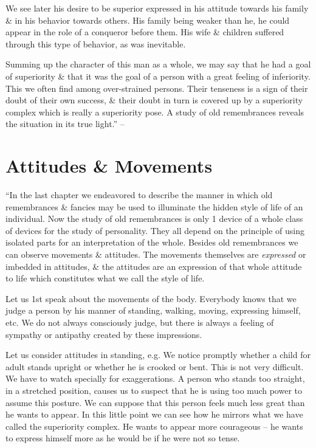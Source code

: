 \documentclass{article}
\begin{document}
We see later his desire to be superior expressed in his attitude towards his family \& in his behavior towards others. His family being weaker than he, he could appear in the role of a conqueror before them. His wife \& children suffered through this type of behavior, as was inevitable.

Summing up the character of this man as a whole, we may say that he had a goal of superiority \& that it was the goal of a person with a great feeling of inferiority. This we often find among over-strained persons. Their tenseness is a sign of their doubt of their own success, \& their doubt in turn is covered up by a superiority complex which is really a superiority pose. A study of old remembrances reveals the situation in its true light.'' -- \cite[pp. 117--134]{Adler_science_living}


\section{Attitudes \& Movements}
``In the last chapter we endeavored to describe the manner in which old remembrances \& fancies may be used to illuminate the hidden style of life of an individual. Now the study of old remembrances is only 1 device of a whole class of devices for the study of personality. They all depend on the principle of using isolated parts for an interpretation of the whole. Besides old remembrances we can observe movements \& attitudes. The movements themselves are \textit{expressed} or imbedded in attitudes, \& the attitudes are an expression of that whole attitude to life which constitutes what we call the style of life.

Let us 1st speak about the movements of the body. Everybody knows that we judge a person by his manner of standing, walking, moving, expressing himself, etc. We do not always consciously judge, but there is always a feeling of sympathy or antipathy created by these impressions.

Let us consider attitudes in standing, e.g. We notice promptly whether a child for adult stands upright or whether he is crooked or bent. This is not very difficult. We have to watch specially for exaggerations. A person who stands too straight, in a stretched position, causes us to suspect that he is using too much power to assume this posture. We can suppose that this person feels much less great than he wants to appear. In this little point we can see how he mirrors what we have called the superiority complex. He wants to appear more courageous -- he wants to express himself more as he would be if he were not so tense.
\end{document}
